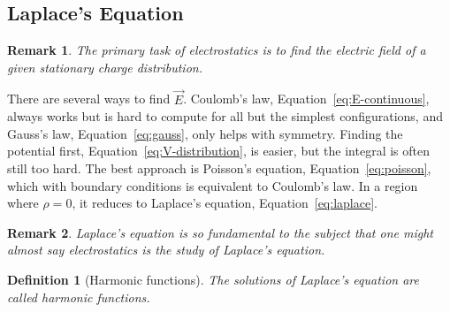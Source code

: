 \documentclass{article}
\newtheorem{definition}{Definition}
\newtheorem{remark}{Remark}
\begin{document}
\subsection{Laplace's Equation}
\begin{remark}
    The primary task of electrostatics is to find the electric field of a given stationary charge distribution.
\end{remark}
There are several ways to find $\vec{E}$. Coulomb's law, Equation~\eqref{eq:E-continuous}, always works but is hard to compute for all but the simplest configurations, and Gauss's law, Equation~\eqref{eq:gauss}, only helps with symmetry. Finding the potential first, Equation~\eqref{eq:V-distribution}, is easier, but the integral is often still too hard. The best approach is Poisson's equation, Equation~\eqref{eq:poisson}, which with boundary conditions is equivalent to Coulomb's law. In a region where $\rho = 0$, it reduces to Laplace's equation, Equation~\eqref{eq:laplace}.
\begin{remark}
    Laplace's equation is so fundamental to the subject that one might almost say electrostatics is the study of Laplace's equation.
\end{remark}
\begin{definition}[Harmonic functions]
    The solutions of Laplace's equation are called harmonic functions.
\end{definition}
\end{document}
